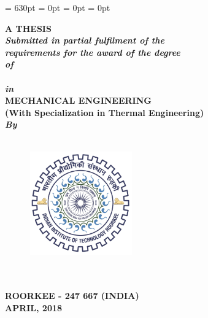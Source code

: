 \begin{titlepage}
\renewcommand{\baselinestretch}{1.5}
  \setlength{\parindent}{0pt}
\textheight = 630pt \topmargin=0pt \voffset=1cm \headheight = 0pt
\marginparwidth= 0pt \headsep = 0pt
\pagestyle{empty}

\begin{center}
\renewcommand{\baselinestretch}{1.2}
\thispagestyle{empty}
\vspace{-10pt}

{\Large \bfseries {\ttitle}\par}\vspace{0.4cm} %

\vspace{0.8cm}
\begingroup
    \fontsize{12pt}{12pt} \selectfont
    \bfseries
\vspace{0.8cm}    
{\large\textbf{A THESIS}} \\
\vspace{0.8cm}
{
{\emph{\emph{\textbf{\textit{Submitted in partial fulfilment of
the \\ requirements for
the award of the degree \\\vspace{0.8cm}
of}}}}\\\vspace{0.8cm}
{\normalsize\textbf{\degreename}}}\\\vspace{0.8cm}
\emph{\emph{\textbf{\textit{in}}}} \\\vspace{0.8cm}
{\normalsize\textbf{MECHANICAL ENGINEERING}}}\\
{\small\textbf {\textsf{(With Specialization in Thermal Engineering)}}} \\
\vspace{1cm}
{\emph {\emph{\textbf{\textit{By}}}}} \\\vspace{0.8cm}
{\normalsize\textbf{\authorname}}\\
\endgroup

\vspace{1.0cm}
\begin{figure}[h]
  \centering
  \includegraphics[width=1.75in, height=1.75in]{formalities/logo.jpg}
\end{figure}
\renewcommand{\baselinestretch}{1.2}
\vspace{1.0cm}
\begingroup
    \fontsize{14pt}{12pt} \selectfont
    \bfseries
\deptname\\
\univname\\
ROORKEE - 247 667 (INDIA)\\
APRIL, 2018  
\endgroup
\end{center}
\end{titlepage}
